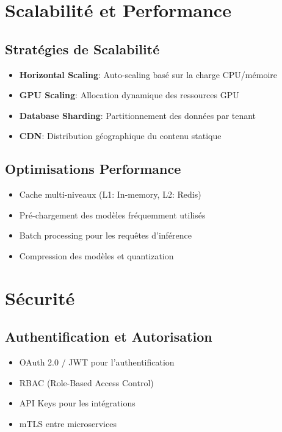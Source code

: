 \documentclass[12pt,a4paper]{article}
\begin{document}
\newpage
\section{Scalabilité et Performance}
\subsection{Stratégies de Scalabilité}
\begin{itemize}
    \item \textbf{Horizontal Scaling}: Auto-scaling basé sur la charge CPU/mémoire
    \item \textbf{GPU Scaling}: Allocation dynamique des ressources GPU
    \item \textbf{Database Sharding}: Partitionnement des données par tenant
    \item \textbf{CDN}: Distribution géographique du contenu statique
\end{itemize}

\subsection{Optimisations Performance}
\begin{itemize}
    \item Cache multi-niveaux (L1: In-memory, L2: Redis)
    \item Pré-chargement des modèles fréquemment utilisés
    \item Batch processing pour les requêtes d'inférence
    \item Compression des modèles et quantization
\end{itemize}

\newpage
\section{Sécurité}
\subsection{Authentification et Autorisation}
\begin{itemize}
    \item OAuth 2.0 / JWT pour l'authentification
    \item RBAC (Role-Based Access Control)
    \item API Keys pour les intégrations
    \item mTLS entre microservices
\end{itemize}
\end{document}
